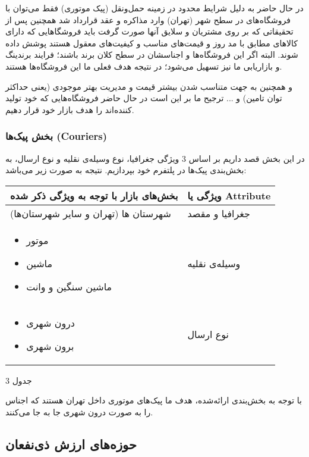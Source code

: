 \documentclass[]{article}
\begin{document}
در حال حاضر به دلیل شرایط محدود در زمینه حمل‌ونقل (پیک موتوری) فقط
می‌توان با فروشگاه‌های در سطح شهر (تهران) وارد مذاکره و عقد قرارداد شد
همچنین پس از تحقیقاتی که بر روی مشتریان و سلایق آنها صورت گرفت باید
فروشگاهایی که دارای کالاهای مطابق با مد روز و قیمت‌های مناسب و کیفیت‌های
معقول هستند پوشش داده شوند. البته اگر این فروشگاه‌ها و اجناسشان در سطح
کلان برند باشند؛ فرایند برندینگ و بازاریابی ما نیز تسهیل می‌شود؛ در
نتیجه هدف فعلی ما این فروشگاه‌ها هستند.

و همچنین به جهت متناسب شدن بیشتر قیمت و مدیریت بهتر موجودی (یعنی حداکثر
توان تامین) و ... ترجیح ما بر این است در حال حاضر فروشگاه‌هایی که خود
تولید کننده‌اند را هدف بازار خود قرار دهیم.

\subsubsection{بخش پیک‌ها
(Couriers)}\label{ux628ux62eux634-ux67eux6ccux6a9ux647ux627-couriers}

در این بخش قصد داریم بر اساس 3 ویژگی جغرافیا، نوع وسیله‌ی نقلیه و نوع
ارسال، به بخش‌بندی پیک‌ها در پلتفرم خود بپردازیم. نتیجه به صورت زیر
می‌باشد:

\begin{longtable}[]{@{}ll@{}}
\toprule
بخش‌های بازار با توجه به ویژگی ذکر شده & ویژگی یا
Attribute\tabularnewline
\midrule
\endhead
شهرستان ها (تهران و سایر شهرستان‌ها) & جغرافیا و مقصد\tabularnewline
\begin{itemize}
\item
  موتور
\item
  ماشین
\item
  ماشین سنگین و وانت
\end{itemize} & وسیله‌ی نقلیه\tabularnewline
\begin{itemize}
\item
  درون شهری
\item
  برون شهری
\end{itemize} & نوع ارسال\tabularnewline
\bottomrule
\end{longtable}

جدول 3

با توجه به بخش‌بندی ارائه‌شده، هدف ما پیک‌های موتوری داخل تهران هستند که
اجناس را به صورت درون شهری جا به جا می‌کنند.

\subsection{حوزه‌های ارزش
ذی‌نفعان}\label{ux62dux648ux632ux647ux647ux627ux6cc-ux627ux631ux632ux634-ux630ux6ccux646ux641ux639ux627ux646}
\end{document}
